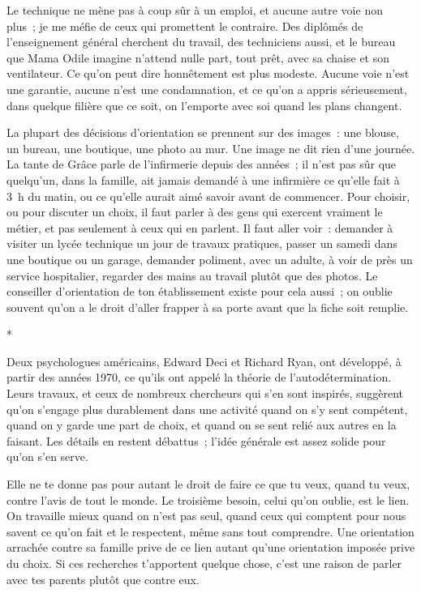 \documentclass[10.5pt,twoside,openright]{book}
\newcommand{\asterisme}{\par\vspace{0.7em}\centerline{\color{gris}*\quad*\quad*}\vspace{0.7em}\par\noindent}
\begin{document}
Le technique ne mène pas à coup sûr à un emploi, et aucune autre voie non plus ; je me méfie de ceux qui promettent le contraire. Des diplômés de l’enseignement général cherchent du travail, des techniciens aussi, et le bureau que Mama Odile imagine n’attend nulle part, tout prêt, avec sa chaise et son ventilateur. Ce qu’on peut dire honnêtement est plus modeste. Aucune voie n’est une garantie, aucune n’est une condamnation, et ce qu’on a appris sérieusement, dans quelque filière que ce soit, on l’emporte avec soi quand les plans changent.

La plupart des décisions d’orientation se prennent sur des images : une blouse, un bureau, une boutique, une photo au mur. Une image ne dit rien d’une journée. La tante de Grâce parle de l’infirmerie depuis des années ; il n’est pas sûr que quelqu’un, dans la famille, ait jamais demandé à une infirmière ce qu’elle fait à 3 h du matin, ou ce qu’elle aurait aimé savoir avant de commencer. Pour choisir, ou pour discuter un choix, il faut parler à des gens qui exercent vraiment le métier, et pas seulement à ceux qui en parlent. Il faut aller voir : demander à visiter un lycée technique un jour de travaux pratiques, passer un samedi dans une boutique ou un garage, demander poliment, avec un adulte, à voir de près un service hospitalier, regarder des mains au travail plutôt que des photos. Le conseiller d’orientation de ton établissement existe pour cela aussi ; on oublie souvent qu’on a le droit d’aller frapper à sa porte avant que la fiche soit remplie.

\asterisme

Deux psychologues américains, Edward Deci et Richard Ryan, ont développé, à partir des années 1970, ce qu’ils ont appelé la théorie de l’autodétermination. Leurs travaux, et ceux de nombreux chercheurs qui s’en sont inspirés, suggèrent qu’on s’engage plus durablement dans une activité quand on s’y sent compétent, quand on y garde une part de choix, et quand on se sent relié aux autres en la faisant. Les détails en restent débattus ; l’idée générale est assez solide pour qu’on s’en serve.

Elle ne te donne pas pour autant le droit de faire ce que tu veux, quand tu veux, contre l’avis de tout le monde. Le troisième besoin, celui qu’on oublie, est le lien. On travaille mieux quand on n’est pas seul, quand ceux qui comptent pour nous savent ce qu’on fait et le respectent, même sans tout comprendre. Une orientation arrachée contre sa famille prive de ce lien autant qu’une orientation imposée prive du choix. Si ces recherches t’apportent quelque chose, c’est une raison de parler avec tes parents plutôt que contre eux.
\end{document}
